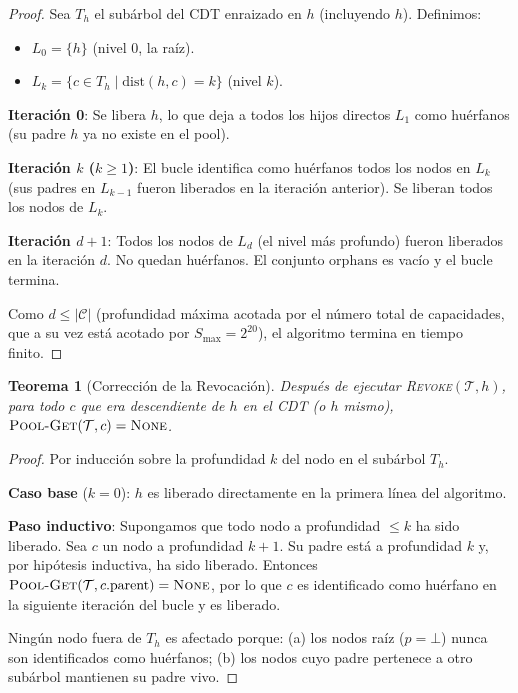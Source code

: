 \documentclass[11pt,twoside,openright]{book}
\theoremstyle{definition}
\theoremstyle{plain}
\newtheorem{theorem}{Teorema}[chapter]
\theoremstyle{remark}
\newcommand{\slotmax}{S_{\max}}
\begin{document}
\begin{proof}
Sea $T_h$ el subárbol del CDT enraizado en $h$ (incluyendo $h$). Definimos:
\begin{itemize}
    \item $L_0 = \{h\}$ (nivel 0, la raíz).
    \item $L_k = \{c \in T_h \mid \text{dist}(h, c) = k\}$ (nivel $k$).
\end{itemize}

\noindent\textbf{Iteración 0}: Se libera $h$, lo que deja a todos los hijos directos $L_1$
como huérfanos (su padre $h$ ya no existe en el pool).

\noindent\textbf{Iteración $k$ ($k \geq 1$)}: El bucle identifica como huérfanos todos los nodos
en $L_k$ (sus padres en $L_{k-1}$ fueron liberados en la iteración anterior). Se liberan
todos los nodos de $L_k$.

\noindent\textbf{Iteración $d + 1$}: Todos los nodos de $L_d$ (el nivel más profundo) fueron
liberados en la iteración $d$. No quedan huérfanos. El conjunto $\text{orphans}$ es vacío
y el bucle termina.

Como $d \leq |\mathcal{C}|$ (profundidad máxima acotada por el número total de capacidades,
que a su vez está acotado por $\slotmax = 2^{20}$), el algoritmo termina en tiempo finito.
\end{proof}

\begin{theorem}[Corrección de la Revocación]
\label{thm:revoke-correct}
Después de ejecutar \textsc{Revoke}$(\mathcal{T}, h)$, para todo $c$ que era descendiente
de $h$ en el CDT (o $h$ mismo), $\textsc{Pool-Get}(\mathcal{T}, c) = \textsc{None}$.
\end{theorem}

\begin{proof}
Por inducción sobre la profundidad $k$ del nodo en el subárbol $T_h$.

\noindent\textbf{Caso base} ($k = 0$): $h$ es liberado directamente en la primera línea del algoritmo.

\noindent\textbf{Paso inductivo}: Supongamos que todo nodo a profundidad $\leq k$ ha sido
liberado. Sea $c$ un nodo a profundidad $k + 1$. Su padre está a profundidad $k$ y, por
hipótesis inductiva, ha sido liberado. Entonces $\textsc{Pool-Get}(\mathcal{T}, c.\text{parent})
= \textsc{None}$, por lo que $c$ es identificado como huérfano en la siguiente iteración
del bucle y es liberado.

Ningún nodo fuera de $T_h$ es afectado porque: (a) los nodos raíz ($p = \bot$) nunca
son identificados como huérfanos; (b) los nodos cuyo padre pertenece a otro subárbol
mantienen su padre vivo.
\end{proof}
\end{document}
